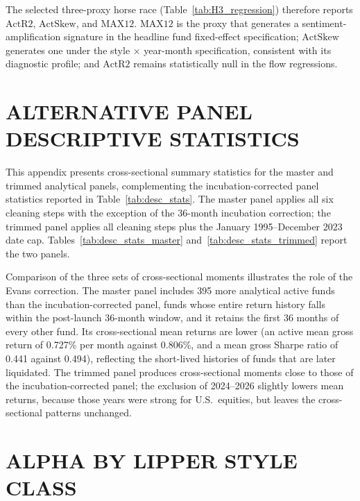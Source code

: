 \documentclass[12pt, oneside]{report}
\begin{document}
The selected three-proxy horse race (Table~\ref{tab:H3_regression})
therefore reports $\text{ActR2}$, $\text{ActSkew}$, and $\text{MAX12}$.
$\text{MAX12}$ is the proxy that generates a sentiment-amplification
signature in the headline fund fixed-effect specification;
$\text{ActSkew}$ generates one under the style $\times$ year-month
specification, consistent with its diagnostic profile; and
$\text{ActR2}$ remains statistically null in the flow regressions.

\chapter{ALTERNATIVE PANEL DESCRIPTIVE STATISTICS}
\label{app:alt_panels}

\noindent This appendix presents cross-sectional summary statistics
for the master and trimmed analytical panels, complementing the
incubation-corrected panel statistics reported in
Table~\ref{tab:desc_stats}. The master panel applies all six cleaning
steps with the exception of the \textcite{Evans2010} 36-month
incubation correction; the trimmed panel applies all cleaning steps
plus the January 1995--December 2023 date cap. Tables~\ref{tab:desc_stats_master}
and~\ref{tab:desc_stats_trimmed} report the two panels.





\noindent Comparison of the three sets of cross-sectional moments
illustrates the role of the Evans correction. The master panel includes
395 more analytical active funds than the incubation-corrected panel,
funds whose entire return history falls within the post-launch 36-month
window, and it retains the first 36 months of every other fund. Its
cross-sectional mean returns are lower (an active mean gross
return of 0.727\% per month against 0.806\%, and a mean gross Sharpe
ratio of 0.441 against 0.494), reflecting the short-lived histories of
funds that are later liquidated. The trimmed panel produces
cross-sectional moments close to those of the incubation-corrected panel;
the exclusion of 2024--2026 slightly lowers mean returns, because those
years were strong for U.S.\ equities, but leaves the cross-sectional
patterns unchanged.

\chapter{ALPHA BY LIPPER STYLE CLASS}
\label{app:lipper_alpha}
\end{document}
